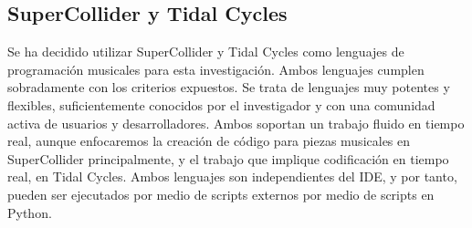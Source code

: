 \subsection{{SuperCollider} y {Tidal Cycles}}
Se ha decidido utilizar {SuperCollider} y {Tidal Cycles} como lenguajes de programación musicales para esta investigación. Ambos lenguajes cumplen sobradamente con los criterios expuestos. Se trata de lenguajes muy potentes y flexibles, suficientemente conocidos por el investigador y con una comunidad activa de usuarios y desarrolladores. Ambos soportan un trabajo fluido en tiempo real, aunque enfocaremos la creación de código para piezas musicales en {SuperCollider} principalmente, y el trabajo que implique codificación en tiempo real, en {Tidal Cycles}. Ambos lenguajes son independientes del IDE, y por tanto, pueden ser ejecutados por medio de scripts externos por medio de scripts en Python. 



